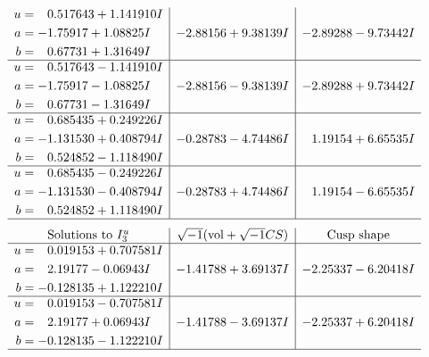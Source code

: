 \documentclass[1p]{elsarticle_modified}
\theoremstyle{definition}
\newcommand{\I}{\sqrt{-1}}
\begin{document}
$$\begin{array}{c|c|c}
\begin{aligned}
u &= \phantom{-}0.517643 + 1.141910 I \\
a &= -1.75917 + 1.08825 I \\
b &= \phantom{-}0.67731 + 1.31649 I\end{aligned}
 & -2.88156 + 9.38139 I & -2.89288 - 9.73442 I \\ \hline\begin{aligned}
u &= \phantom{-}0.517643 - 1.141910 I \\
a &= -1.75917 - 1.08825 I \\
b &= \phantom{-}0.67731 - 1.31649 I\end{aligned}
 & -2.88156 - 9.38139 I & -2.89288 + 9.73442 I \\ \hline\begin{aligned}
u &= \phantom{-}0.685435 + 0.249226 I \\
a &= -1.131530 + 0.408794 I \\
b &= \phantom{-}0.524852 - 1.118490 I\end{aligned}
 & -0.28783 - 4.74486 I & \phantom{-}1.19154 + 6.65535 I \\ \hline\begin{aligned}
u &= \phantom{-}0.685435 - 0.249226 I \\
a &= -1.131530 - 0.408794 I \\
b &= \phantom{-}0.524852 + 1.118490 I\end{aligned}
 & -0.28783 + 4.74486 I & \phantom{-}1.19154 - 6.65535 I\\
 \hline 
 \end{array}$$\newpage$$\begin{array}{c|c|c}  
\text{Solutions to }I^u_{3}& \I (\text{vol} + \sqrt{-1}CS) & \text{Cusp shape}\\
 \hline 
\begin{aligned}
u &= \phantom{-}0.019153 + 0.707581 I \\
a &= \phantom{-}2.19177 - 0.06943 I \\
b &= -0.128135 + 1.122210 I\end{aligned}
 & -1.41788 + 3.69137 I & -2.25337 - 6.20418 I \\ \hline\begin{aligned}
u &= \phantom{-}0.019153 - 0.707581 I \\
a &= \phantom{-}2.19177 + 0.06943 I \\
b &= -0.128135 - 1.122210 I\end{aligned}
 & -1.41788 - 3.69137 I & -2.25337 + 6.20418 I\\
 \hline 
 \end{array}$$\newpage\newpage\renewcommand{\arraystretch}{1}
\end{document}
